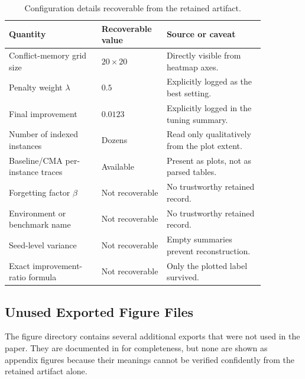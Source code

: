 \documentclass{article} %
\begin{document}
\begin{table}[h]
\centering
\small
\caption{Configuration details recoverable from the retained artifact.}
\label{tab:recoverable_config}
\begin{tabular}{p{0.32\linewidth}p{0.20\linewidth}p{0.34\linewidth}}
\toprule
Quantity & Recoverable value & Source or caveat \\
\midrule
Conflict-memory grid size & $20 \times 20$ & Directly visible from heatmap axes. \\
Penalty weight $\lambda$ & $0.5$ & Explicitly logged as the best setting. \\
Final improvement & $0.0123$ & Explicitly logged in the tuning summary. \\
Number of indexed instances & Dozens & Read only qualitatively from the plot extent. \\
Baseline/CMA per-instance traces & Available & Present as plots, not as parsed tables. \\
Forgetting factor $\beta$ & Not recoverable & No trustworthy retained record. \\
Environment or benchmark name & Not recoverable & No trustworthy retained record. \\
Seed-level variance & Not recoverable & Empty summaries prevent reconstruction. \\
Exact improvement-ratio formula & Not recoverable & Only the plotted label survived. \\
\bottomrule
\end{tabular}
\end{table}

\subsection{Unused Exported Figure Files}

The figure directory contains several additional exports that were not used in the paper. They are documented in  for completeness, but none are shown as appendix figures because their meanings cannot be verified confidently from the retained artifact alone.
\end{document}
